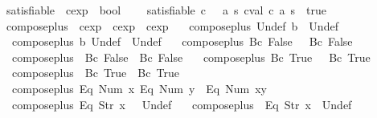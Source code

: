 \begin{isabellebody}
\isanewline
{}\isamarkupfalse%
\ satisfiable\ {\isacharcolon}{\isacharcolon}\ {\isachardoublequoteopen}cexp\ {\isasymRightarrow}\ bool{\isachardoublequoteclose}\ \ \isanewline
\ \ {\isachardoublequoteopen}satisfiable\ c\ {\isasymequiv}\ {\isacharparenleft}{\isasymexists}\ a\ s{\isachardot}\ cval\ c\ a\ s\ {\isacharequal}\ true{\isacharparenright}{\isachardoublequoteclose}\isanewline
\isanewline
{}\isamarkupfalse%
\ compose{\isacharunderscore}plus\ {\isacharcolon}{\isacharcolon}\ {\isachardoublequoteopen}cexp\ {\isasymRightarrow}\ cexp\ {\isasymRightarrow}\ cexp{\isachardoublequoteclose}\ \isanewline
\ \ {\isachardoublequoteopen}compose{\isacharunderscore}plus\ Undef\ b\ {\isacharequal}\ Undef{\isachardoublequoteclose}\ {\isacharbar}\isanewline
\ \ {\isachardoublequoteopen}compose{\isacharunderscore}plus\ b\ Undef\ {\isacharequal}\ Undef{\isachardoublequoteclose}\ {\isacharbar}\isanewline
\ \ {\isachardoublequoteopen}compose{\isacharunderscore}plus\ {\isacharparenleft}Bc\ False{\isacharparenright}\ {\isacharunderscore}\ {\isacharequal}\ Bc\ False{\isachardoublequoteclose}\ {\isacharbar}\isanewline
\ \ {\isachardoublequoteopen}compose{\isacharunderscore}plus\ {\isacharunderscore}\ {\isacharparenleft}Bc\ False{\isacharparenright}\ {\isacharequal}\ Bc\ False{\isachardoublequoteclose}\ {\isacharbar}\isanewline
\ \ {\isachardoublequoteopen}compose{\isacharunderscore}plus\ {\isacharparenleft}Bc\ True{\isacharparenright}\ {\isacharunderscore}\ {\isacharequal}\ Bc\ True{\isachardoublequoteclose}\ {\isacharbar}\isanewline
\ \ {\isachardoublequoteopen}compose{\isacharunderscore}plus\ {\isacharunderscore}\ {\isacharparenleft}Bc\ True{\isacharparenright}\ {\isacharequal}\ Bc\ True{\isachardoublequoteclose}\ {\isacharbar}\isanewline
\ \ {\isachardoublequoteopen}compose{\isacharunderscore}plus\ {\isacharparenleft}Eq\ {\isacharparenleft}Num\ x{\isacharparenright}{\isacharparenright}\ {\isacharparenleft}Eq\ {\isacharparenleft}Num\ y{\isacharparenright}{\isacharparenright}\ {\isacharequal}\ Eq\ {\isacharparenleft}Num\ {\isacharparenleft}x{\isacharplus}y{\isacharparenright}{\isacharparenright}{\isachardoublequoteclose}\ {\isacharbar}\isanewline
\ \ {\isachardoublequoteopen}compose{\isacharunderscore}plus\ {\isacharparenleft}Eq\ {\isacharparenleft}Str\ x{\isacharparenright}{\isacharparenright}\ {\isacharunderscore}\ {\isacharequal}\ Undef{\isachardoublequoteclose}\ {\isacharbar}\isanewline
\ \ {\isachardoublequoteopen}compose{\isacharunderscore}plus\ {\isacharunderscore}\ {\isacharparenleft}Eq\ {\isacharparenleft}Str\ x{\isacharparenright}{\isacharparenright}\ {\isacharequal}\ Undef{\isachardoublequoteclose}\ {\isacharbar}\isanewline

\end{isabellebody}
